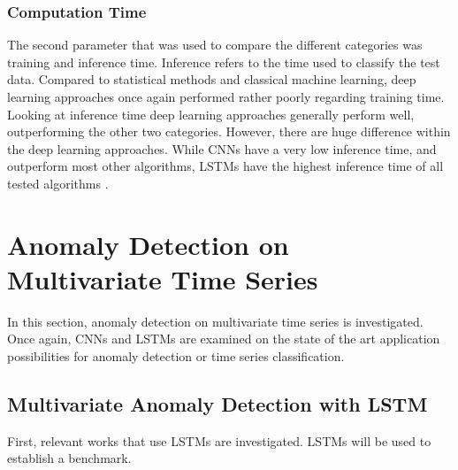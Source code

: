 \subsubsection{Computation Time}
The second parameter that was used to compare the different categories was training and inference time. Inference refers to the time used to classify the test data. Compared to statistical methods and classical machine learning, deep learning approaches once again performed rather poorly regarding training time. Looking at inference time deep learning approaches generally perform well, outperforming the other two categories. However, there are huge difference within the deep learning approaches. While CNNs have a very low inference time, and outperform most other algorithms, LSTMs have the highest inference time of all tested algorithms \parencite{Braei2020}.  


\section{Anomaly Detection on Multivariate Time Series}
In this section, anomaly detection on multivariate time series is investigated. Once again, CNNs and LSTMs are examined on the state of the art application possibilities for anomaly detection or time series classification.

\subsection{Multivariate Anomaly Detection with LSTM}
First, relevant works that use LSTMs are investigated. LSTMs will be used to establish a benchmark.

